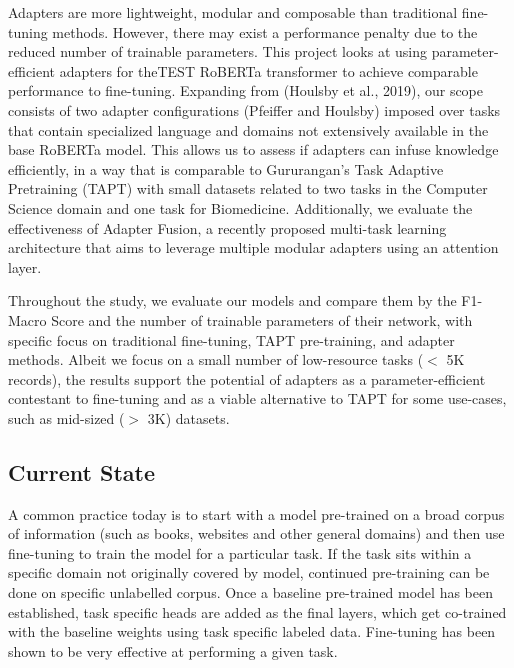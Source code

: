 \documentclass[10pt,twocolumn,letterpaper]{article}
\begin{document}
Adapters are more lightweight, modular and composable than traditional fine-tuning methods. However, there may exist a performance penalty due to the reduced number of trainable parameters. This project looks at using parameter-efficient adapters for theTEST  RoBERTa transformer to achieve comparable performance to fine-tuning. Expanding from (Houlsby et al., 2019), our scope consists of two adapter configurations (Pfeiffer and Houlsby) imposed over tasks that contain specialized language and domains not extensively available in the base RoBERTa model. This allows us to assess if adapters can infuse knowledge efficiently, in a way that is comparable to Gururangan’s Task Adaptive Pretraining (TAPT) with small datasets related to two tasks in the Computer Science domain and one task for Biomedicine. Additionally, we evaluate the effectiveness of Adapter Fusion, a recently proposed multi-task learning architecture that aims to leverage multiple modular adapters using an attention layer. 

Throughout the study, we evaluate our models and compare them by the F1-Macro Score and the number of trainable parameters of their network, with specific focus on traditional fine-tuning, TAPT pre-training, and adapter methods. Albeit we focus on a small number of low-resource tasks ($<$ 5K records), the results support the potential of adapters as a parameter-efficient contestant to fine-tuning and as a viable alternative to TAPT for some use-cases, such as mid-sized ($>$ 3K) datasets.

\subsection{Current State} A common practice today is to start with a model pre-trained on a broad corpus of information (such as books, websites and other general domains) and then use fine-tuning to train the model for a particular task. If the task sits within a specific domain not originally covered by model, continued  pre-training can be done on specific unlabelled corpus. Once a baseline pre-trained model has been established, task specific heads are added as the final layers, which get co-trained with the baseline weights using task specific labeled data. Fine-tuning has been shown to be very effective at performing a given task.
\end{document}
